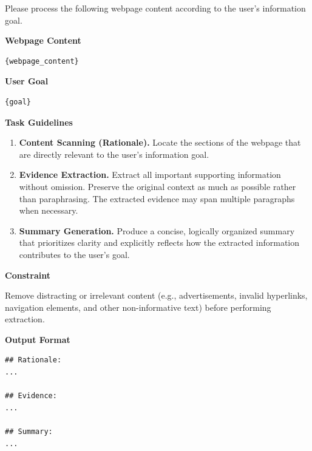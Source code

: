 \documentclass{huawei}
\begin{document}
\begin{tcolorbox}[
    title=\textbf{Prompt for Webpage Summary},
    enhanced,
    colback=gray!5,
    colframe=gray!70,
    boxrule=0.8pt,
    arc=2mm,
    left=3mm,
    right=3mm,
    top=2mm,
    bottom=2mm,
    breakable,
    fonttitle=\bfseries
]
\ttfamily
Please process the following webpage content according to the user's information goal.

\vspace{0.5em}

\textbf{Webpage Content}
\begin{verbatim}
{webpage_content}
\end{verbatim}

\textbf{User Goal}
\begin{verbatim}
{goal}
\end{verbatim}

\textbf{Task Guidelines}

\begin{enumerate}
    \item \textbf{Content Scanning (Rationale).}
    Locate the sections of the webpage that are directly relevant to the user's information goal.

    \item \textbf{Evidence Extraction.}
    Extract all important supporting information without omission. Preserve the original context as much as possible rather than paraphrasing. The extracted evidence may span multiple paragraphs when necessary.

    \item \textbf{Summary Generation.}
    Produce a concise, logically organized summary that prioritizes clarity and explicitly reflects how the extracted information contributes to the user's goal.
\end{enumerate}

\textbf{Constraint}

Remove distracting or irrelevant content (e.g., advertisements, invalid hyperlinks, navigation elements, and other non-informative text) before performing extraction.

\vspace{0.5em}

\textbf{Output Format}

\begin{verbatim}
## Rationale:
...

## Evidence:
...

## Summary:
...
\end{verbatim}


\end{tcolorbox}

%
\end{document}
